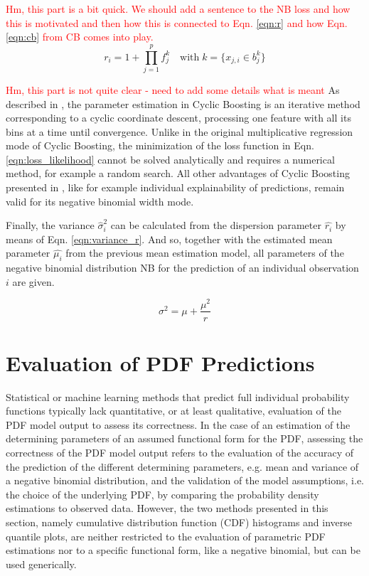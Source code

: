 \documentclass[BCOR=1mm, DIV=calc,10pt,
twoside=true,
twocolumn,
headings=normal]{scrartcl}
\newcommand{\eqn}{Eqn. }
\begin{document}
\textcolor{red}{Hm, this part is a bit quick. We should add a sentence to the NB loss 
and how this is motivated and then how this is connected to \eqn \eqref{eqn:r} and how
\eqn \eqref {eqn:cb} from CB comes into play.}
\begin{equation} \label{eqn:r}
r_i = 1 + \prod \limits_{j=1}^p f^k_j \quad \text{with}\; k=\{ x_{j,i} \in b^k_j\}
\end{equation}

\textcolor{red}{Hm, this part is not quite clear - need to add some details what is meant}
As described in \cite{Wick2019}, the parameter estimation in Cyclic Boosting is an
iterative method corresponding to a cyclic coordinate descent, processing one feature with
all its bins at a time until convergence. Unlike in the original multiplicative regression
mode of Cyclic Boosting, the minimization of the loss function in \eqn
\eqref{eqn:loss_likelihood} cannot be solved analytically and requires a numerical method,
for example a random search. All other advantages of Cyclic Boosting presented in
\cite{cyclicboosting}, like for example individual explainability of predictions, remain
valid for its negative binomial width mode.

Finally, the variance $\hat{\sigma}^2_i$ can be calculated from the dispersion parameter
$\hat{r_i}$ by means of \eqn \eqref{eqn:variance_r}. And so, together with the estimated
mean parameter $\hat{\mu_i}$ from the previous mean estimation model, all parameters of
the negative binomial distribution NB for the prediction of an individual observation $i$
are given.

\begin{equation} \label{eqn:variance_r}
\sigma^2 = \mu + \frac{\mu^2}{r}
\end{equation}


\section{Evaluation of PDF Predictions}
\label{sec:pdfEvaluation}

Statistical or machine learning methods that predict full individual probability functions typically lack
quantitative, or at least qualitative, evaluation of the PDF model output to assess its
correctness. In the case of an estimation of the determining parameters of an assumed
functional form for the PDF, assessing the correctness of the PDF model output refers to
the evaluation of the accuracy of the prediction of the different determining parameters,
e.g. mean and variance of a negative binomial distribution, and the validation of the
model assumptions, i.e. the choice of the underlying PDF, by comparing the probability
density estimations to observed data. However, the two methods presented in this section,
namely cumulative distribution function (CDF) histograms and inverse quantile plots, are
neither restricted to the evaluation of parametric PDF estimations nor to a specific
functional form, like a negative binomial, but can be used generically.
\end{document}
